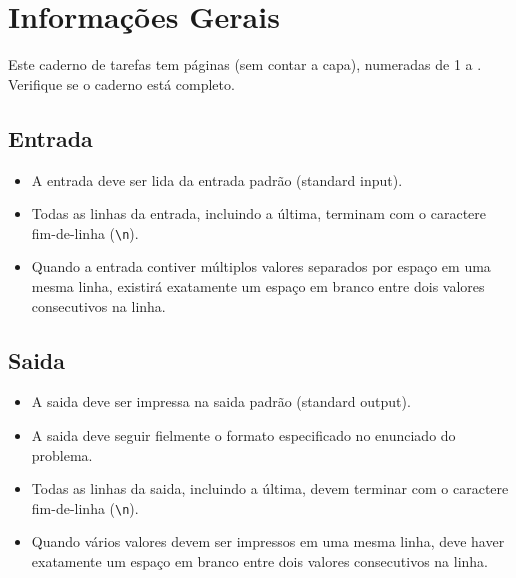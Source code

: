 \section*{Informações Gerais}

Este caderno de tarefas tem \pageref*{lastpage} páginas (sem contar a capa), numeradas de 1 a \pageref*{lastpage}. Verifique se o caderno está completo.

\subsection*{Entrada}

\begin{itemize}
  \item A entrada deve ser lida da entrada padrão (standard input).

	\item Todas as linhas da entrada, incluindo a última, terminam com o caractere fim-de-linha (\texttt{\textbackslash n}).

	\item Quando a entrada contiver múltiplos valores separados por espaço em uma mesma linha, existirá exatamente um espaço em branco entre dois valores consecutivos na linha.
\end{itemize}

\subsection*{Saida}

\begin{itemize}
	\item A saida deve ser impressa na saida padrão (standard output).

	\item A saida deve seguir fielmente o formato especificado no enunciado do problema.

	\item Todas as linhas da saida, incluindo a última, devem terminar com o caractere fim-de-linha (\texttt{\textbackslash n}).

	\item Quando vários valores devem ser impressos em uma mesma linha, deve
    haver exatamente um espaço em branco entre dois valores consecutivos na
    linha.

\end{itemize}

